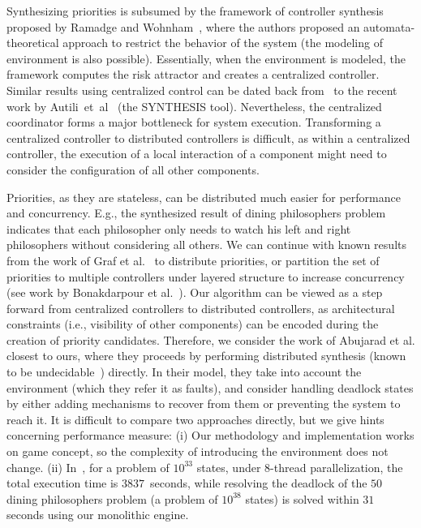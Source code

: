 \documentclass[10pt, a4paper, onecolumn, conference, compsocconf]{IEEEtran}
\begin{document}
Synthesizing priorities is subsumed by the framework of controller synthesis proposed by Ramadge and Wohnham~\cite{ramadge1989control}, where the authors proposed an automata-theoretical approach to restrict the behavior of the system (the modeling of environment is also possible).
Essentially, when the environment is modeled, the framework computes the risk attractor and creates a centralized controller.
Similar results using centralized control can be dated back from~\cite{balemi1993supervisory} to the recent work by Autili~et~al~\cite{autili2007synthesis} (the SYNTHESIS tool). Nevertheless, the centralized coordinator forms a major bottleneck for system execution. Transforming a centralized controller to distributed controllers is difficult, as within a centralized controller, the execution of a local interaction of a component might need to consider the configuration of all other components.

Priorities, as they are stateless, can be distributed much easier for performance and concurrency. E.g., the synthesized result of dining philosophers problem indicates that each philosopher only needs to watch his left and right philosophers without considering all others. We can continue with known results from the work of Graf et al.~\cite{GrafPQ10} to distribute priorities, or partition the set of priorities to multiple controllers under layered structure to increase concurrency (see work by Bonakdarpour et al.~\cite{Bonakdarpour2011distribute}). Our algorithm can be viewed as a step forward from centralized controllers to distributed controllers, as architectural constraints (i.e., visibility of other components) can be encoded during the creation of priority candidates. Therefore, we consider the work of Abujarad et al.\cite{abujarad2009parallelizing}  closest to ours, where they proceeds by performing distributed synthesis (known to be undecidable~\cite{PnueliFOCS90})  directly. In their model, they take into account the environment (which they refer it as faults), and consider handling deadlock states by either adding mechanisms to recover from them or preventing the system to reach it. It is difficult to compare two approaches directly, but we give hints concerning performance measure: (i) Our methodology and implementation works on game concept, so the complexity of introducing the environment does not change. (ii) In~\cite{abujarad2009parallelizing}, for a problem of $10^{33}$ states, under $8$-thread parallelization, the total execution time is $3837$~seconds, while resolving the deadlock of the $50$ dining philosophers problem (a problem of $10^{38}$ states) is solved within $31$ seconds using our monolithic engine.
\end{document}
